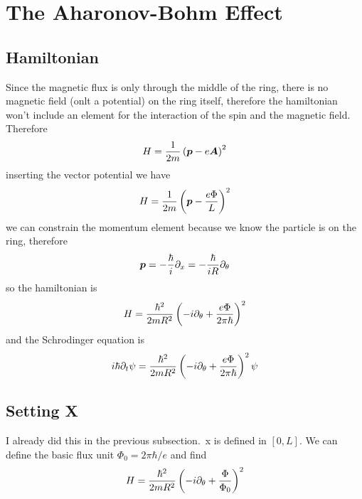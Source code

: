 \section{The Aharonov-Bohm Effect}
\subsection{Hamiltonian}
Since the magnetic flux is only through the middle of the ring, there is no magnetic field (onlt a potential) on the ring itself, therefore the hamiltonian won't include an element for the interaction of the spin and the magnetic field. Therefore
\begin{equation}
	H = \frac{1}{2m}\left(\bm{p}-e\bm{A}\right)^2
\end{equation}
inserting the vector potential we have
\begin{equation}
	H = \frac{1}{2m}\left(\bm{p}-\frac{e\Phi}{L}\right)^2
\end{equation}
we can constrain the momentum element because we know the particle is on the ring, therefore
\begin{equation}
	\bm{p} = -\frac{\hbar}{i}\partial_x = -\frac{\hbar}{iR}\partial_\theta
\end{equation}
so the hamiltonian is
\begin{equation}
	H = \frac{\hbar^2}{2mR^2}\left(-i\partial_\theta+\frac{e\Phi}{2\pi\hbar}\right)^2
\end{equation}
and the Schrodinger equation is
\begin{equation}
	i\hbar\partial_t\psi = \frac{\hbar^2}{2mR^2}\left(-i\partial_\theta+\frac{e\Phi}{2\pi\hbar}\right)^2\psi
\end{equation}
\subsection{Setting X}
I already did this in the previous subsection.\ x is defined in \(\left[0,L\right]\). We can define the basic flux unit \(\Phi_0 = 2\pi\hbar/e\) and find
\begin{equation}
	H = \frac{\hbar^2}{2mR^2}\left(-i\partial_\theta+\frac{\Phi}{\Phi_0}\right)^2
\end{equation}
